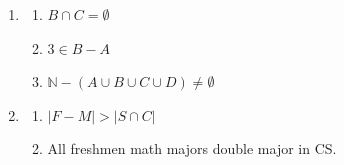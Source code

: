 \documentclass{article}
\newcommand{\N}{\mathbb{N}}
\theoremstyle{definition}
\begin{document}
\begin{solution}
\begin{enumerate}
\item 
    \begin{enumerate}
    \item $B\cap C = \emptyset$
    \item $3\in B- A$
    \item $\N -(A\cup B\cup C\cup D) \neq \emptyset$
    \end{enumerate}
\item 
    \begin{enumerate}
    \item $|F - M| > |S\cap C|$
    \item All freshmen math majors double major in CS.
    \end{enumerate}
\end{enumerate}
\end{solution}
\end{document}
